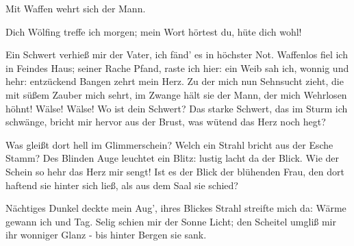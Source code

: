 \begin{drama}

Mit Waffen wehrt sich der Mann.
 



Dich Wölfing treffe ich morgen;
mein Wort hörtest du, hüte dich wohl!
 



\scene



\Siegmundspeaks
Ein Schwert verhieß mir der Vater,
ich fänd' es in höchster Not.
Waffenlos fiel ich in Feindes Haus;
seiner Rache Pfand, raste ich hier:
ein Weib sah ich, wonnig und hehr:
entzückend Bangen zehrt mein Herz.
Zu der mich nun Sehnsucht zieht,
die mit süßem Zauber mich sehrt,
im Zwange hält sie der Mann,
der mich Wehrlosen höhnt!
Wälse! Wälse! Wo ist dein Schwert?
Das starke Schwert,
das im Sturm ich schwänge,
bricht mir hervor aus der Brust,
was wütend das Herz noch hegt?
 



Was gleißt dort hell im Glimmerschein?
Welch ein Strahl bricht aus der Esche Stamm?
Des Blinden Auge leuchtet ein Blitz:
lustig lacht da der Blick.
Wie der Schein so hehr das Herz mir sengt!
Ist es der Blick der blühenden Frau,
den dort haftend sie hinter sich ließ,
als aus dem Saal sie schied?
 



Nächtiges Dunkel deckte mein Aug',
ihres Blickes Strahl streifte mich da:
Wärme gewann ich und Tag.
Selig schien mir der Sonne Licht;
den Scheitel umgliß mir ihr wonniger Glanz -
bis hinter Bergen sie sank.
 




\end{drama}
